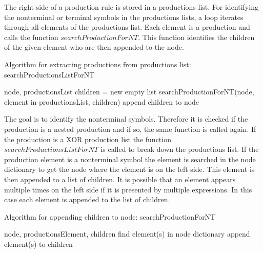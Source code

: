 The right side of a production rule is stored in a productions list. For identifying the nonterminal or terminal symbols in the productions lists, a loop iterates through all elements of the productions list. Each element is a production and calls the function $searchProductionForNT$. This function identifies the children of the given element who are then appended to the node.

\begin{algorithm}[H]
\caption{Algorithm for extracting productions from productions list: searchProductionsListForNT}
\begin{algorithmic}[1] 
\Require node, productionsList
	\State children = new empty list
	\State searchProductionForNT(node, element in productionsList, children)
	\State append children to node
\EndFor
\end{algorithmic}
\end{algorithm}

The goal is to identify the nonterminal symbols. Therefore it is checked if the production is a nested production and if so, the same function is called again. If the production is a XOR production list the function $searchProductionsListForNT$ is called to break down the productions list. If the production element is a nonterminal symbol the element is searched in the node dictionary to get the node where the element is on the left side. This element is then appended to a list of children. It is possible that an element appears multiple times on the left side if it is presented by multiple expressions. In this case each element is appended to the list of children.

\begin{algorithm}[H]
\caption{Algorithm for appending children to node: searchProductionForNT}
\begin{algorithmic}[1] 
\Require node, productionsElement, children
		\State find element(s) in node dictionary
		\State append element(s) to children
	\EndIf
\EndFor
\end{algorithmic}
\end{algorithm}

